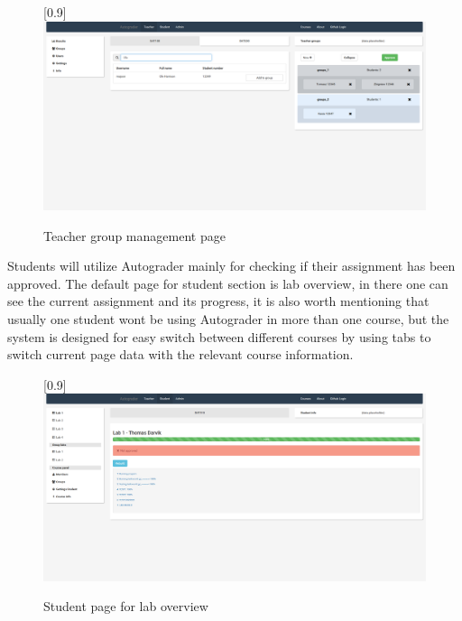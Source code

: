 \begin{figure}[h]
 \scalebox{1}[0.9]{{\includegraphics[width=1\linewidth]{graphs/grouppageteacher.png}}}
  \caption{Teacher group management page}
  \label{fig:grouppageteacher}
\end{figure}
\newpage
Students will utilize Autograder mainly for checking if their assignment has been approved. The default page for student section is lab overview, in there one can see the current assignment and its progress, it is also worth mentioning that usually one student wont be using Autograder in more than one course, but the system is designed for easy switch between different courses by using tabs to switch current page data with the relevant course information.
\begin{figure}[h]
  \scalebox{1}[0.9]{{\includegraphics[width=1\linewidth]{graphs/student.png}}}
  \caption{Student page for lab overview}
  \label{fig:studentpage}
\end{figure}

